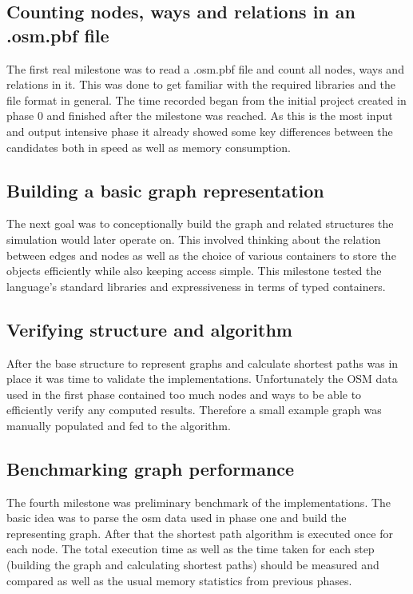 \subsection{Counting nodes, ways and relations in an .osm.pbf file}
\label{subsec:Concept::Implementation::Counting}

The first real milestone was to read a .osm.pbf file and count all nodes, ways and relations in it. This was done to get familiar with the required libraries and the file format in general. The time recorded began from the initial project created in phase 0 and finished after the milestone was reached. As this is the most input and output intensive phase it already showed some key differences between the candidates both in speed as well as memory consumption.

\subsection{Building a basic graph representation}
\label{subsec:Concept::Implementation::Graph_Representation}

The next goal was to conceptionally build the graph and related structures the simulation would later operate on. This involved thinking about the relation between edges and nodes as well as the choice of various containers to store the objects efficiently while also keeping access simple. This milestone tested the language's standard libraries and expressiveness in terms of typed containers.

\subsection{Verifying structure and algorithm}
\label{subsec:Concept::Implementation::Verification}

After the base structure to represent graphs and calculate shortest paths was in place it was time to validate the implementations. Unfortunately the OSM data used in the first phase contained too much nodes and ways to be able to efficiently verify any computed results. Therefore a small example graph was manually populated and fed to the algorithm.

\subsection{Benchmarking graph performance}
\label{subsec:Concept::Implementation::SequentialBenchmark}

The fourth milestone was preliminary benchmark of the implementations. The basic idea was to parse the \gls{osm} data used in phase one and build the representing graph. After that the shortest path algorithm is executed once for each node. The total execution time as well as the time taken for each step (building the graph and calculating shortest paths) should be measured and compared as well as the usual memory statistics from previous phases.

